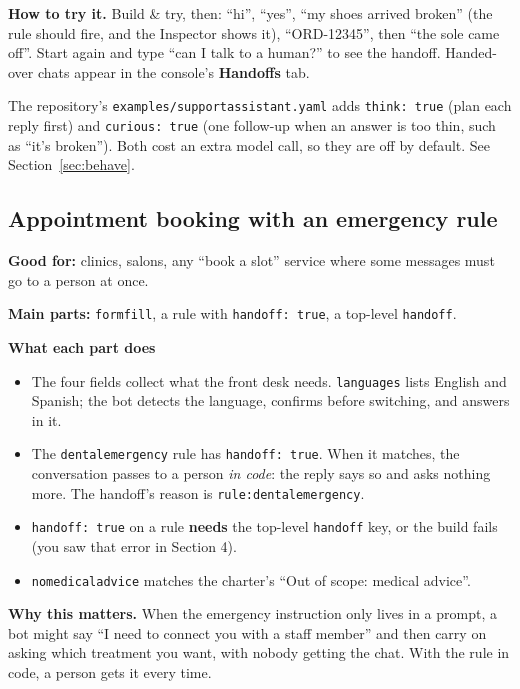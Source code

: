 \documentclass[11pt,a4paper]{article}
\newcommand{\snip}[1]{}
\newcommand{\codeus}{\textunderscore\allowbreak}
\newcommand{\code}[1]{{\renewcommand{\_}{\codeus}\texttt{\upshape #1}}}
\newcommand{\key}[1]{{\renewcommand{\_}{\codeus}\texttt{\color{ckey}#1}}}
\newcommand{\recipehead}[2]{%
  \begin{tcolorbox}[enhanced,colback=boxE,colframe=boxE,arc=2pt,left=8pt,right=8pt,top=4pt,bottom=4pt]
  \small\textbf{\color{keel}Good for:} #1\par
  \textbf{\color{keel}Main parts:} #2
  \end{tcolorbox}}
\begin{document}
\textbf{How to try it.} Build \& try, then: ``hi'', ``yes'', ``my shoes arrived broken'' (the rule should fire, and
the Inspector shows it), ``ORD-12345'', then ``the sole came off''. Start again and type ``can I talk to a human?''
to see the handoff. Handed-over chats appear in the console's \textbf{Handoffs} tab.

\begin{tip}
The repository's \code{examples/support\_assistant.yaml} adds \code{think: true} (plan each reply first) and
\code{curious: true} (one follow-up when an answer is too thin, such as ``it's broken''). Both cost an extra model
call, so they are off by default. See Section~\ref{sec:behave}.
\end{tip}

\subsection{Appointment booking with an emergency rule}
\recipehead{clinics, salons, any ``book a slot'' service where some messages must go to a person at once.}%
{\key{form\_fill}, a rule with \code{handoff: true}, a top-level \key{handoff}.}

\snip{03_booking.yaml}

\textbf{What each part does}
\begin{itemize}[leftmargin=1.2em]
  \item The four fields collect what the front desk needs. \key{languages} lists English and Spanish; the bot
    detects the language, confirms before switching, and answers in it.
  \item The \key{dental\_emergency} rule has \code{handoff: true}. When it matches, the conversation passes to a
    person \emph{in code}: the reply says so and asks nothing more. The handoff's reason is
    \code{rule:dental\_emergency}.
  \item \code{handoff: true} on a rule \textbf{needs} the top-level \key{handoff} key, or the build fails (you saw
    that error in Section 4).
  \item \code{no\_medical\_advice} matches the charter's ``Out of scope: medical advice''.
\end{itemize}

\textbf{Why this matters.} When the emergency instruction only lives in a prompt, a bot might say ``I need to
connect you with a staff member'' and then carry on asking which treatment you want, with nobody getting the
chat. With the rule in code, a person gets it every time.
\end{document}

